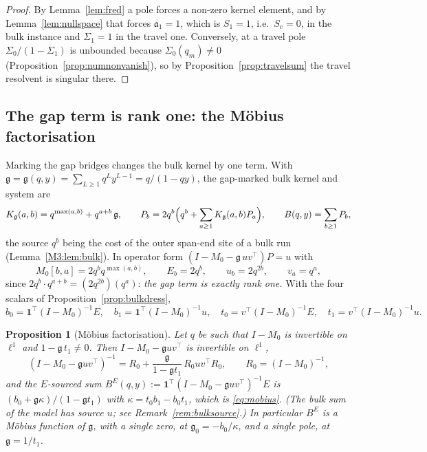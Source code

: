 \documentclass[11pt]{article}
\theoremstyle{plain}
\newtheorem{proposition}[theorem]{Proposition}
\theoremstyle{definition}
\theoremstyle{remark}
\begin{document}
\begin{proof}
By Lemma~\ref{lem:fred} a pole forces a non-zero kernel element, and by Lemma~\ref{lem:nullspace}
that forces $\mathfrak a_1=1$, which is $S_1=1$, i.e.\ $S_e=0$, in the bulk instance and
$\Sigma_1=1$ in the travel one. Conversely, at a travel pole $\Sigma_0/(1-\Sigma_1)$ is unbounded
because $\Sigma_0(q_m)\ne0$ (Proposition~\ref{prop:numnonvanish}), so by
Proposition~\ref{prop:travelsum} the travel resolvent is singular there.
\end{proof}

\subsection{The gap term is rank one: the M\"obius factorisation}\label{sec:mob}

Marking the gap bridges changes the bulk kernel by one term. With
$\mathfrak g=\mathfrak g(q,y)=\sum_{L\ge1}q^Ly^{L-1}=q/(1-qy)$, the gap-marked bulk kernel and
system are
\begin{equation}\label{eq:gapkernel}
   K_{\mathfrak g}(a,b)=q^{\max(a,b)}+q^{a+b}\,\mathfrak g,\qquad
   P_b=2q^b\Bigl(q^b+\sum_{a\ge1}K_{\mathfrak g}(a,b)P_a\Bigr),\qquad B(q,y)=\sum_{b\ge1}P_b ,
\end{equation}
the source $q^b$ being the cost of the outer span-end site of a bulk run (Lemma~\ref{M3:lem:bulk}). In operator form
$(I-M_0-\mathfrak g\,uv^{\!\top})P=u$ with
\begin{equation}\label{eq:rankone}
   M_0[b,a]=2q^bq^{\max(a,b)},\qquad E_b=2q^b,\qquad u_b=2q^{2b},\qquad v_a=q^a ,
\end{equation}
since $2q^b\cdot q^{a+b}=(2q^{2b})(q^a)$: \emph{the gap term is exactly rank one.} With the four
scalars of Proposition~\ref{prop:bulkdress},
\[
  b_0=\mathbf 1^{\!\top}(I-M_0)^{-1}E,\quad b_1=\mathbf 1^{\!\top}(I-M_0)^{-1}u,\quad
  t_0=v^{\!\top}(I-M_0)^{-1}E,\quad t_1=v^{\!\top}(I-M_0)^{-1}u .
\]

\begin{proposition}[M\"obius factorisation]\label{prop:mobius}
Let $q$ be such that $I-M_0$ is invertible on $\ell^1$ and $1-\mathfrak g\,t_1\ne0$. Then
$I-M_0-\mathfrak guv^{\!\top}$ is invertible on $\ell^1$,
\begin{equation}\label{eq:smresolvent}
   (I-M_0-\mathfrak guv^{\!\top})^{-1}
   =R_0+\frac{\mathfrak g}{1-\mathfrak gt_1}\,R_0uv^{\!\top}R_0,\qquad R_0=(I-M_0)^{-1},
\end{equation}
and the $E$-sourced sum $B^E(q,y):=\mathbf 1^{\!\top}(I-M_0-\mathfrak guv^{\!\top})^{-1}E$ is
$(b_0+\mathfrak g\kappa)/(1-\mathfrak g t_1)$ with $\kappa=t_0b_1-b_0t_1$, which is
\eqref{eq:mobius}. \textup{(}The bulk sum of the model has source $u$; see
Remark~\ref{rem:bulksource}.\textup{)} In particular $B^E$ is a M\"obius function of $\mathfrak g$, with a single zero,
at $\mathfrak g_0=-b_0/\kappa$, and a single pole, at $\mathfrak g=1/t_1$.
\end{proposition}
\end{document}
